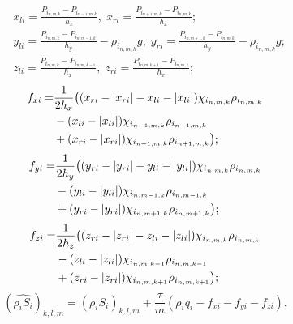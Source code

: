 \begin{equation*}
  \begin{aligned}
    &x_{li}= \frac{P_{i_{n,m,k}}-P_{i_{n-1,m,k}}}{h_x} , \;
    x_{ri}=  \frac{P_{i_{n+1,m,k}}-P_{i_{n,m,k}}}{h_x} ;\\
    &y_{li}= \frac{P_{i_{n,m,k}}-P_{i_{n,m-1,k}}}{h_y} - \rho_{i_{n,m,k}} g,\;
    y_{ri}=  \frac{P_{i_{n,m+1,k}}-P_{i_{n,m,k}}}{h_y} - \rho_{i_{n,m,k}} g;\\
    &z_{li}= \frac{P_{i_{n,m,k}}-P_{i_{n,m,k-1}}}{h_x} , \;
    z_{ri}=  \frac{P_{i_{n,m,k+1}}-P_{i_{n,m,k}}}{h_x} ;
  \end{aligned}
\end{equation*}
\begin{eqnarray*}
  \begin{aligned}
    f_{xi} =& \frac{1}{2h_x} \bigl{(} (x_{ri} - |x_{ri}| - x_{li} - |x_{li}|) \chi_{i_{n,m,k}} \rho_{i_{n,m,k}} \\
    &- (x_{li} - |x_{li}|) \chi_{i_{n-1,m,k}} \rho_{i_{n-1,m,k}} \\
    &+ (x_{ri} - |x_{ri}|) \chi_{i_{n+1,m,k}} \rho_{i_{n+1,m,k}} \bigr{)};
  \end{aligned}
\end{eqnarray*}
\begin{eqnarray*}
  \begin{aligned}
    f_{yi} =& \frac{1}{2h_y} \bigl{(} (y_{ri} - |y_{ri}| - y_{li} - |y_{li}|) \chi_{i_{n,m,k}} \rho_{i_{n,m,k}} \\
    &- (y_{li} - |y_{li}|) \chi_{i_{n,m-1,k}} \rho_{i_{n,m-1,k}} \\
    &+ (y_{ri} - |y_{ri}|) \chi_{i_{n,m+1,k}} \rho_{i_{n,m+1,k}} \bigr{)};
  \end{aligned}
\end{eqnarray*}
\begin{eqnarray*}
  \begin{aligned}
    f_{zi} =& \frac{1}{2h_z} \bigl{(} (z_{ri} - |z_{ri}| - z_{li} - |z_{li}|) \chi_{i_{n,m,k}} \rho_{i_{n,m,k}} \\
    &- (z_{li} - |z_{li}|) \chi_{i_{n,m,k-1}} \rho_{i_{n,m,k-1}} \\
    &+ (z_{ri} - |z_{ri}|) \chi_{i_{n,m,k+1}} \rho_{i_{n,m,k+1}} \bigr{)};
  \end{aligned}
\end{eqnarray*}
\begin{equation*}
    (\widehat{\rho_i S_i})_{k,l,m}=(\rho_i S_i)_{k,l,m}+\frac{\tau}{m}(\rho_i q_i - f_{xi} - f_{yi} - f_{zi}).
\end{equation*}

